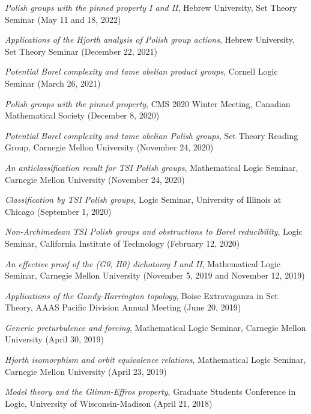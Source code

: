 \documentclass[letterpaper]{article}
\renewenvironment{itemize}{
  \begin{list}{}{
    \setlength{\leftmargin}{1.5em}
  }
}{
  \end{list}
}
\begin{document}
\begin{itemize}
    \item \emph{Polish groups with the pinned property I and II}, Hebrew University, Set Theory Seminar (May 11 and 18, 2022)
    
    \item \emph{Applications of the Hjorth analysis of Polish group actions}, Hebrew University, Set Theory Seminar (December 22, 2021)
    
    \item \emph{Potential Borel complexity and tame abelian product groups}, Cornell Logic Seminar (March 26, 2021)
    
    \item \emph{Polish groups with the pinned property}, CMS 2020 Winter Meeting, Canadian Mathematical Society (December 8, 2020)
    
    \item \emph{Potential Borel complexity and tame abelian Polish groups}, Set Theory Reading Group, Carnegie Mellon University (November 24, 2020)
    
    \item \emph{An anticlassification result for TSI Polish groups}, Mathematical Logic Seminar, Carnegie Mellon University (November 24, 2020)
    
    \item \emph{Classification by TSI Polish groups}, Logic Seminar, University of Illinois at Chicago (September 1, 2020)
    
    \item \emph{Non-Archimedean TSI Polish groups and obstructions to Borel reducibility}, Logic Seminar, California Institute of Technology (February 12, 2020)
    
    \item \emph{An effective proof of the (G0, H0) dichotomy I and II}, Mathematical Logic Seminar, Carnegie Mellon University (November 5, 2019 and November 12, 2019)
    
    \item \emph{Applications of the Gandy-Harrington topology}, Boise Extravaganza in Set Theory, AAAS Pacific Division Annual Meeting (June 20, 2019)
    
    \item \emph{Generic preturbulence and forcing}, Mathematical Logic Seminar, Carnegie Mellon University (April 30, 2019)
    
    \item \emph{Hjorth isomorphism and orbit equivalence relations}, Mathematical Logic Seminar, Carnegie Mellon University (April 23, 2019)
    
    \item \emph{Model theory and the Glimm-Effros property}, Graduate Students Conference in Logic, University of Wisconsin-Madison (April 21, 2018)
\end{itemize}
\end{document}
